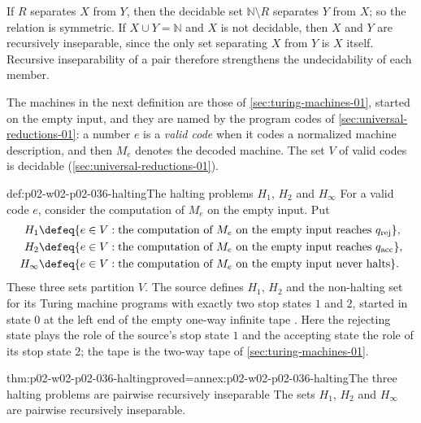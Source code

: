 If \(R\) separates \(X\) from \(Y\), then the decidable set
\(\mathbb N\setminus R\) separates \(Y\) from \(X\); so the relation is
symmetric.  If \(X\cup Y=\mathbb N\) and \(X\) is not decidable, then \(X\) and
\(Y\) are recursively inseparable, since the only set separating \(X\) from
\(Y\) is \(X\) itself.  Recursive inseparability of a pair therefore
strengthens the undecidability of each member.

The machines in the next definition are those of
\cref{sec:turing-machines-01}, started on the empty input, and they are named
by the program codes of \cref{sec:universal-reductions-01}: a number \(e\) is a
\emph{valid code} when it codes a normalized machine description, and then
\(M_e\) denotes the decoded machine.  The set \(V\) of valid codes is
decidable (\cref{sec:universal-reductions-01}).

\begin{hbdefinition}{def:p02-w02-p02-036-halting}{The halting problems \(H_1\), \(H_2\) and \(H_\infty\)}
For a valid code \(e\), consider the computation of \(M_e\) on the empty
input.  Put
\[
\begin{aligned}
 H_1&\defeq\{e\in V:\text{the computation of }M_e\text{ on the empty input
      reaches }q_{\mathrm{rej}}\},\\
 H_2&\defeq\{e\in V:\text{the computation of }M_e\text{ on the empty input
      reaches }q_{\mathrm{acc}}\},\\
 H_\infty&\defeq\{e\in V:\text{the computation of }M_e\text{ on the empty
      input never halts}\}.
\end{aligned}
\]
These three sets partition \(V\).  The source defines \(H_1\), \(H_2\) and the
non-halting set for its Turing machine programs with exactly two stop states
\(1\) and \(2\), started in state \(0\) at the left end of the empty one-way
infinite tape \cite[Sect.~2.1.2, p.~34]{BorgerGradelGurevich1997}.  Here the
rejecting state plays the role of the source's stop state \(1\) and the
accepting state the role of its stop state \(2\); the tape is the two-way tape
of \cref{sec:turing-machines-01}.
\end{hbdefinition}

\begin{hblemma}{thm:p02-w02-p02-036-halting}{proved=annex:p02-w02-p02-036-halting}{The three halting problems are pairwise recursively inseparable}
The sets \(H_1\), \(H_2\) and \(H_\infty\) are pairwise recursively
inseparable.
\end{hblemma}

